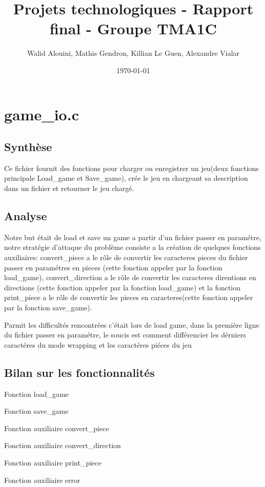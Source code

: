 \documentclass[12pt]{article}
\begin{document}
\title{Projets technologiques - Rapport final - Groupe TMA1C}
\author{Walid Alouini, Mathis Gendron, Killian Le Guen, Alexandre Vialar}
\date{\today}

\maketitle
\tableofcontents

\section{game\_io.c}
\subsection{Synthèse}
Ce fichier fournit des fonctions pour charger ou enregistrer un jeu(deux fonctions principale Load\_game et Save\_game), crée le jeu en chargeant sa description dans un fichier et retourner le jeu chargé.
\subsection{Analyse}
Notre but était de load et save un game a partir d'un fichier passer en paramétre, notre stratégie d'attaque du problème consiste a la création de quelques fonctions auxiliaires: convert\_piece a le rôle de convertir les caracteres pieces du fichier passer en paramétres en pieces (cette fonction appeler par la fonction load\_game), convert\_direction a le rôle de convertir les caracteres direntions en directions (cette fonction appeler par la fonction load\_game) et la fonction print\_piece a le rôle de convertir les pieces en caracteres(cette fonction appeler par la fonction save\_game).

Parmit les difficultés rencontrées c'était lors de load game, dans la première ligne du fichier passer en paramétre, le soucis est comment différencier les dérniers caractéres du mode wrapping et les caractéres piéces du jeu
\subsection{Bilan sur les fonctionnalités}
Fonction load\_game

Fonction save\_game

Fonction auxiliaire convert\_piece

Fonction auxiliaire convert\_direction

Fonction auxiliaire print\_piece

Fonction auxiliaire error
\end{document}

